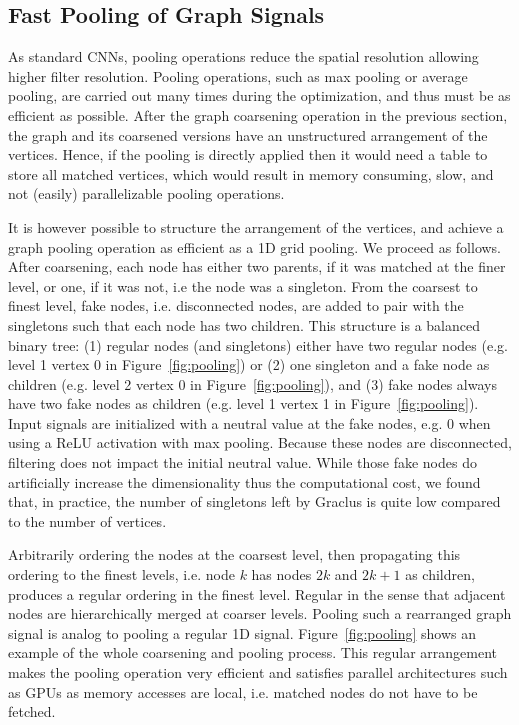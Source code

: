 \documentclass{article}
\newcommand{\figref}[1]{Figure~\ref{fig:#1}}
\begin{document}
\subsection{Fast Pooling of Graph Signals}  \label{sec:pooling}
As standard CNNs, pooling operations reduce the spatial resolution allowing higher filter resolution. Pooling operations, such as max pooling or average pooling, are carried out many times during the optimization, and thus must be as efficient as possible. After the graph coarsening operation in the previous section, the graph and its coarsened versions have an unstructured arrangement of the vertices. Hence, if the pooling is directly applied then it would need a table to store all matched vertices, which would result in memory consuming, slow, and not (easily) parallelizable pooling operations. 

It is however possible to structure the arrangement of the vertices, and achieve a graph pooling operation as efficient as a 1D grid pooling. We proceed as follows. After coarsening, each node has either two
parents, if it was matched at the finer level, or one, if it was not, i.e the
node was a singleton. From the coarsest to finest level, fake nodes, i.e.
disconnected nodes, are added to pair with the singletons such that each node
has two children. This structure is a balanced binary tree: (1)
regular nodes (and singletons) either have two regular nodes (e.g. level 1
vertex 0 in \figref{pooling}) or (2) one singleton and a fake node as children
(e.g. level 2 vertex 0 in \figref{pooling}), and (3) fake nodes always have two
fake nodes as children (e.g. level 1 vertex 1 in \figref{pooling}). Input
signals are initialized with a neutral value at the fake nodes, e.g. 0 when
using a ReLU activation with max pooling. Because these nodes are disconnected,
filtering does not impact the initial neutral value. While those fake nodes do
artificially increase the dimensionality thus the computational cost, we found
that, in practice, the number of singletons left by Graclus is quite low
compared to the number of vertices.

Arbitrarily ordering the nodes at the coarsest level, then propagating this
ordering to the finest levels, i.e. node $k$ has nodes $2k$ and $2k+1$ as
children, produces a regular ordering in the finest level. Regular in the sense
that adjacent nodes are hierarchically merged at coarser levels. Pooling such a
rearranged graph signal is analog to pooling a regular 1D signal.
\figref{pooling} shows an example of the whole coarsening and pooling process.
This regular arrangement makes the pooling operation very efficient and
satisfies parallel architectures such as GPUs as memory accesses are local, i.e.
matched nodes do not have to be fetched.
\end{document}
